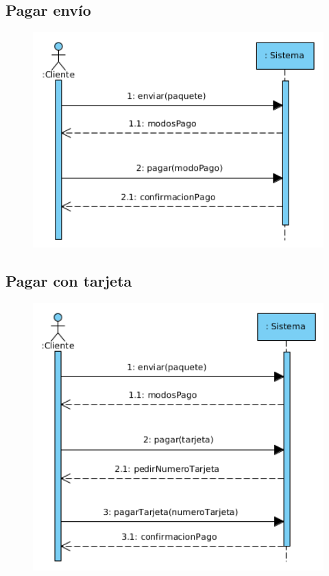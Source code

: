 \subsection{Pagar envío}
\begin{figure}[H]
	\centering
	\includegraphics[width=16cm]{56}
\end{figure}
\subsection{Pagar con tarjeta}
\begin{figure}[H]
	\centering
	\includegraphics[width=16cm]{57}
\end{figure}
